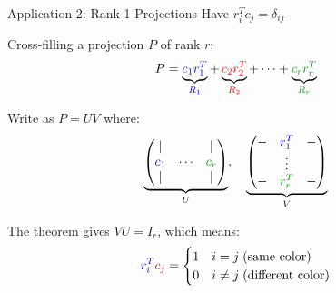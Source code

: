 \documentclass[10pt]{beamer}
\theoremstyle{definition}
\newcommand{\gn}[1]{{\color{green!60!black}#1}}       %
\newcommand{\rd}[1]{{\color{red}#1}}                  %
\newcommand{\bl}[1]{{\color{blue}#1}}                 %
\begin{document}
\begin{frame}{Application 2: Rank-1 Projections Have $r_i^T c_j = \delta_{ij}$}

Cross-filling a projection $P$ of rank $r$:
$$P = \underbrace{\bl{c_1} \bl{r_1^T}}_{\bl{R_1}} + \underbrace{\rd{c_2} \rd{r_2^T}}_{\rd{R_2}} + \cdots + \underbrace{\gn{c_r} \gn{r_r^T}}_{\gn{R_r}}$$

Write as $P = UV$ where:
$$\underbrace{\begin{pmatrix}
| & & | \\
\bl{c_1} & \cdots & \gn{c_r} \\
| & & |
\end{pmatrix}}_{U}, \quad
\underbrace{\begin{pmatrix}
- & \bl{r_1^T} & - \\
& \vdots & \\
- & \gn{r_r^T} & -
\end{pmatrix}}_{V}$$

The theorem gives $VU = I_r$, which means:
$$\bl{r_i^T} \rd{c_j} = \begin{cases} 1 & i = j \;\text{(same color)} \\ 0 & i \neq j \;\text{(different color)} \end{cases}$$

\end{frame}
\end{document}
